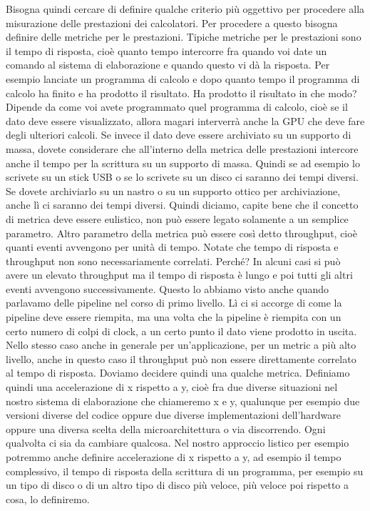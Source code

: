 Bisogna quindi cercare di definire qualche criterio più oggettivo per procedere alla misurazione delle prestazioni dei calcolatori.
Per procedere a questo bisogna definire delle metriche per le prestazioni.
Tipiche metriche per le prestazioni sono il tempo di risposta, cioè quanto tempo intercorre fra quando voi date un comando al sistema di elaborazione e quando questo vi dà la risposta.
Per esempio lanciate un programma di calcolo e dopo quanto tempo il programma di calcolo ha finito e ha prodotto il risultato.
Ha prodotto il risultato in che modo?
Dipende da come voi avete programmato quel programma di calcolo, cioè se il dato deve essere visualizzato, allora magari interverrà anche la GPU che deve fare degli ulteriori calcoli.
Se invece il dato deve essere archiviato su un supporto di massa, dovete considerare che all'interno della metrica delle prestazioni intercore anche il tempo per la scrittura su un supporto di massa.
Quindi se ad esempio lo scrivete su un stick USB o se lo scrivete su un disco ci saranno dei tempi diversi.
Se dovete archiviarlo su un nastro o su un supporto ottico per archiviazione, anche lì ci saranno dei tempi diversi.
Quindi diciamo, capite bene che il concetto di metrica deve essere eulistico, non può essere legato solamente a un semplice parametro.
Altro parametro della metrica può essere così detto throughput, cioè quanti eventi avvengono per unità di tempo.
Notate che tempo di risposta e throughput non sono necessariamente correlati.
Perché?
In alcuni casi si può avere un elevato throughput ma il tempo di risposta è lungo e poi tutti gli altri eventi avvengono successivamente.
Questo lo abbiamo visto anche quando parlavamo delle pipeline nel corso di primo livello.
Lì ci si accorge di come la pipeline deve essere riempita, ma una volta che la pipeline è riempita con un certo numero di colpi di clock, a un certo punto il dato viene prodotto in uscita.
Nello stesso caso anche in generale per un'applicazione, per un metric a più alto livello, anche in questo caso il throughput può non essere direttamente correlato al tempo di risposta.
Doviamo decidere quindi una qualche metrica.
Definiamo quindi una accelerazione di x rispetto a y, cioè fra due diverse situazioni nel nostro sistema di elaborazione che chiameremo x e y, qualunque per esempio due versioni diverse del codice oppure due diverse implementazioni dell'hardware oppure una diversa scelta della microarchitettura o via discorrendo.
Ogni qualvolta ci sia da cambiare qualcosa.
Nel nostro approccio listico per esempio potremmo anche definire accelerazione di x rispetto a y, ad esempio il tempo complessivo, il tempo di risposta della scrittura di un programma, per esempio su un tipo di disco o di un altro tipo di disco più veloce, più veloce poi rispetto a cosa, lo definiremo.
